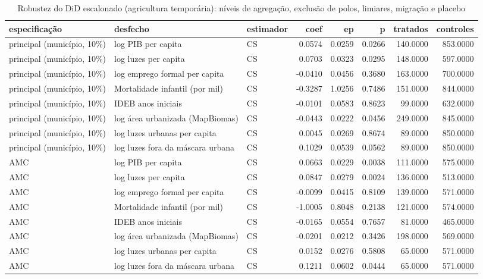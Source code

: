 \begin{table}
\caption{Robustez do DiD escalonado (agricultura temporária): níveis de agregação, exclusão de polos, limiares, migração e placebo}
\label{tab:s08_robustez}
\begin{tabular}{lllrrrrr}
\toprule
especificação & desfecho & estimador & coef & ep & p & tratados & controles \\
\midrule
principal (município, 10\%) & log PIB per capita & CS & 0.0574 & 0.0259 & 0.0266 & 140.0000 & 853.0000 \\
principal (município, 10\%) & log luzes per capita & CS & 0.0703 & 0.0323 & 0.0295 & 148.0000 & 597.0000 \\
principal (município, 10\%) & log emprego formal per capita & CS & -0.0410 & 0.0456 & 0.3680 & 163.0000 & 700.0000 \\
principal (município, 10\%) & Mortalidade infantil (por mil) & CS & -0.3287 & 1.0256 & 0.7486 & 151.0000 & 844.0000 \\
principal (município, 10\%) & IDEB anos iniciais & CS & -0.0101 & 0.0583 & 0.8623 & 99.0000 & 632.0000 \\
principal (município, 10\%) & log área urbanizada (MapBiomas) & CS & -0.0443 & 0.0222 & 0.0456 & 249.0000 & 845.0000 \\
principal (município, 10\%) & log luzes urbanas per capita & CS & 0.0045 & 0.0269 & 0.8674 & 89.0000 & 850.0000 \\
principal (município, 10\%) & log luzes fora da máscara urbana & CS & 0.1029 & 0.0539 & 0.0562 & 89.0000 & 850.0000 \\
AMC & log PIB per capita & CS & 0.0663 & 0.0229 & 0.0038 & 111.0000 & 575.0000 \\
AMC & log luzes per capita & CS & 0.0847 & 0.0279 & 0.0024 & 136.0000 & 513.0000 \\
AMC & log emprego formal per capita & CS & -0.0099 & 0.0415 & 0.8109 & 139.0000 & 571.0000 \\
AMC & Mortalidade infantil (por mil) & CS & -1.0005 & 0.8048 & 0.2138 & 121.0000 & 574.0000 \\
AMC & IDEB anos iniciais & CS & -0.0165 & 0.0554 & 0.7657 & 81.0000 & 465.0000 \\
AMC & log área urbanizada (MapBiomas) & CS & -0.0201 & 0.0212 & 0.3426 & 198.0000 & 569.0000 \\
AMC & log luzes urbanas per capita & CS & 0.0152 & 0.0276 & 0.5808 & 65.0000 & 571.0000 \\
AMC & log luzes fora da máscara urbana & CS & 0.1211 & 0.0602 & 0.0444 & 65.0000 & 571.0000 \\

\end{tabular}
\end{table}
